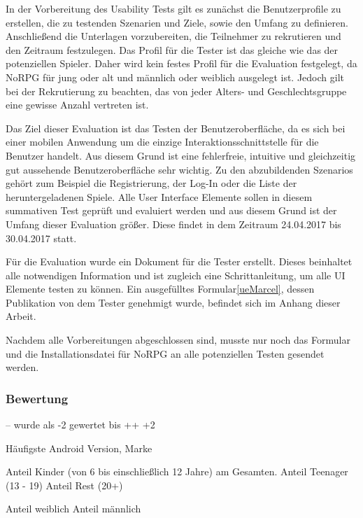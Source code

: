 			In der Vorbereitung des Usability Tests gilt es zunächst die Benutzerprofile zu erstellen, die zu testenden Szenarien und Ziele, sowie den Umfang zu definieren. Anschließend die Unterlagen vorzubereiten, die Teilnehmer zu rekrutieren und den Zeitraum festzulegen. Das Profil für die Tester ist das gleiche wie das der potenziellen Spieler. Daher wird kein festes Profil für die Evaluation festgelegt, da NoRPG für jung oder alt und männlich oder weiblich ausgelegt ist. Jedoch gilt bei der Rekrutierung zu beachten, das von jeder Alters- und Geschlechtsgruppe eine gewisse Anzahl vertreten ist.
		
			Das Ziel dieser Evaluation ist das Testen der Benutzeroberfläche, da es sich bei einer mobilen Anwendung um die einzige Interaktionsschnittstelle für die Benutzer handelt. Aus diesem Grund ist eine fehlerfreie, intuitive und gleichzeitig gut aussehende Benutzeroberfläche sehr wichtig. Zu den abzubildenden Szenarios gehört zum Beispiel die Registrierung, der Log-In oder die Liste der heruntergeladenen Spiele. Alle User Interface Elemente sollen in diesem summativen Test geprüft und evaluiert werden und aus diesem Grund ist der Umfang dieser Evaluation größer. Diese findet in dem Zeitraum 24.04.2017 bis 30.04.2017 statt.
		
			Für die Evaluation wurde ein Dokument für die Tester erstellt. Dieses beinhaltet alle notwendigen Information und ist zugleich eine Schrittanleitung, um alle UI Elemente testen zu können. Ein ausgefülltes Formular\ref{ueMarcel}, dessen Publikation von dem Tester genehmigt wurde, befindet sich im Anhang dieser Arbeit.
		
			Nachdem alle Vorbereitungen abgeschlossen sind, musste nur noch das Formular und die Installationsdatei für NoRPG an alle potenziellen Testen gesendet werden.
		
		\subsubsection{Bewertung}
			-- wurde als -2 gewertet bis ++ +2
			
			Häufigste Android Version, Marke
			
			Anteil Kinder (von 6 bis einschließlich 12 Jahre) am Gesamten.
			Anteil Teenager (13 - 19)
			Anteil Rest (20+)
			
			Anteil weiblich
			Anteil männlich
			
